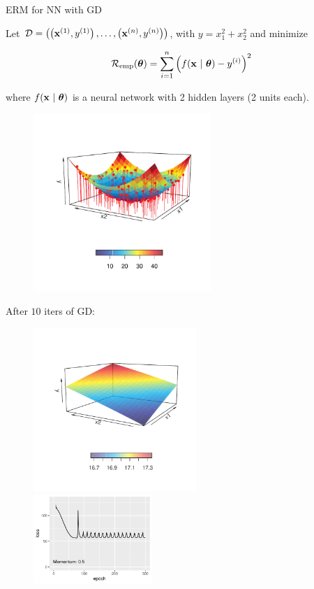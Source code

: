 \documentclass[11pt,compress,t,notes=noshow, xcolor=table]{beamer}
\begin{document}
\begin{vbframe}{ERM for NN with GD}

Let $\mathcal{D} = \left( \left(\mathbf{x}^{(1)}, y^{(1)}\right), \ldots, \left(\mathbf{x}^{(n)}, y^{(n)}\right)\right)$, with $y = x_1^2 + x_2^2$ and minimize 

\vspace*{-0.3cm}

$$
	\mathcal{R}_{\text{emp}}(\bm{\theta}) = \sum\limits_{i=1}^n \left(f(\mathbf{x} ~|~ \bm{\theta}) - y^{(i)}\right)^2
$$

\vspace*{-0.1cm}

where $f(\mathbf{x} ~|~ \bm{\theta})$ is a neural network with 2 hidden layers (2 units each). 

\vspace*{-1.5cm}

\begin{figure}
	\includegraphics[width=0.6\textwidth]{figure_man/gradient_descent_NN_0.pdf}
\end{figure}

\framebreak 

After $10$ iters of GD: 

\begin{figure}
	\includegraphics[width=0.55\textwidth]{figure_man/gradient_descent_NN_10_surface_0.5.pdf} ~~ \includegraphics[width=0.4\textwidth]{figure_man/gradient_descent_NN_300_history_0.5.pdf} 
\end{figure}


\end{vbframe}
\end{document}
